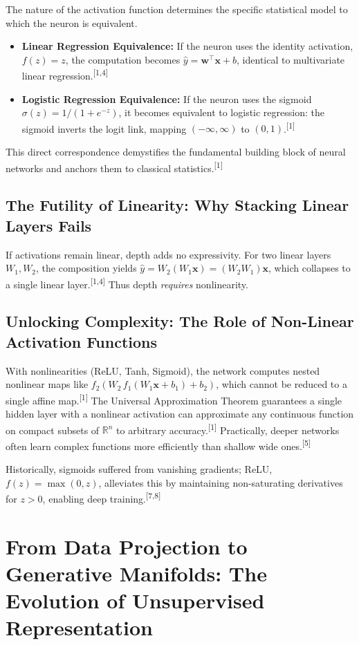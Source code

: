 \documentclass[11pt]{article}
\newcommand{\refnum}[1]{\textsuperscript{[#1]}}
\newcommand{\R}{\mathbb{R}}
\begin{document}
The nature of the activation function determines the specific statistical model to which the neuron is equivalent.
\begin{itemize}[leftmargin=1.2em]
\item \textbf{Linear Regression Equivalence:} If the neuron uses the identity activation, $f(z)=z$, the computation becomes $\hat{y}=\mathbf{w}^\top\mathbf{x}+b$, identical to multivariate linear regression.\refnum{1,4}
\item \textbf{Logistic Regression Equivalence:} If the neuron uses the sigmoid $\sigma(z)=1/(1+e^{-z})$, it becomes equivalent to logistic regression: the sigmoid inverts the logit link, mapping $( -\infty,\infty)$ to $(0,1)$.\refnum{1}
\end{itemize}
This direct correspondence demystifies the fundamental building block of neural networks and anchors them to classical statistics.\refnum{1}

\subsection{The Futility of Linearity: Why Stacking Linear Layers Fails}
If activations remain linear, depth adds no expressivity. For two linear layers $W_1,W_2$, the composition yields $\hat{y}=W_2(W_1\mathbf{x})=(W_2W_1)\mathbf{x}$, which collapses to a single linear layer.\refnum{1,4} Thus depth \emph{requires} nonlinearity.

\subsection{Unlocking Complexity: The Role of Non-Linear Activation Functions}
With nonlinearities (ReLU, Tanh, Sigmoid), the network computes nested nonlinear maps like $f_2(W_2\,f_1(W_1\mathbf{x}+b_1)+b_2)$, which cannot be reduced to a single affine map.\refnum{1} The Universal Approximation Theorem guarantees a single hidden layer with a nonlinear activation can approximate any continuous function on compact subsets of $\R^n$ to arbitrary accuracy.\refnum{1} Practically, deeper networks often learn complex functions more efficiently than shallow wide ones.\refnum{5}

Historically, sigmoids suffered from vanishing gradients; ReLU, $f(z)=\max(0,z)$, alleviates this by maintaining non-saturating derivatives for $z>0$, enabling deep training.\refnum{7,8}

\section{From Data Projection to Generative Manifolds: The Evolution of Unsupervised Representation}
\end{document}
